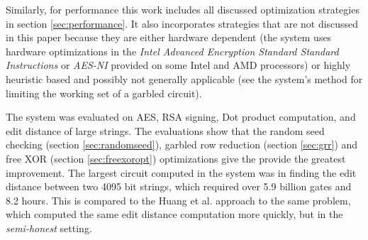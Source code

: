 Similarly, for performance this work includes all discussed optimization strategies in section \ref{sec:performance}. It also incorporates strategies that are not discussed in this paper because they are either hardware dependent (the system uses hardware optimizations in the \emph{Intel Advanced Encryption Standard Standard Instructions} or \emph{AES-NI} provided on some Intel and AMD processors) or highly heuristic based and possibly not generally applicable (see the system's method for limiting the working set of a garbled circuit).

The system was evaluated on AES, RSA signing, Dot product computation, and edit distance of large strings.  The evaluations show that the random seed checking (section \ref{sec:randomseed}), garbled row reduction (section \ref{sec:grr}) and free XOR (section \ref{sec:freexoropt}) optimizations give the provide the greatest improvement.  The largest circuit computed in the system was in finding the edit distance between two 4095 bit strings, which required over 5.9 billion gates and 8.2 hours.  This is compared to the Huang et al. approach to the same problem, which computed the same edit distance computation more quickly, but in the \emph{semi-honest} setting.
